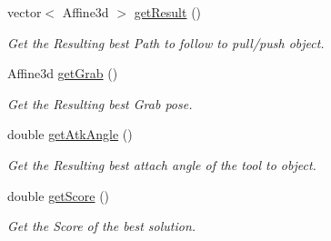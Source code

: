 \begin{DoxyCompactItemize}
vector$<$ Affine3d $>$ \hyperlink{classMCT__Search_ab28fe87c4254e464ab8cfce14ffc665e}{get\+Result} ()
\begin{DoxyCompactList}\small\item\em Get the Resulting best Path to follow to pull/push object. \end{DoxyCompactList}\item 
Affine3d \hyperlink{classMCT__Search_a924b943dc6a98886ada00eb596d04e1c}{get\+Grab} ()
\begin{DoxyCompactList}\small\item\em Get the Resulting best Grab pose. \end{DoxyCompactList}\item 
double \hyperlink{classMCT__Search_ac21fe2ffab807bfcc9c8da9863791433}{get\+Atk\+Angle} ()
\begin{DoxyCompactList}\small\item\em Get the Resulting best attach angle of the tool to object. \end{DoxyCompactList}\item 
double \hyperlink{classMCT__Search_aa7029de4d31d20f106ce215affca20e0}{get\+Score} ()
\begin{DoxyCompactList}\small\item\em Get the Score of the best solution. \end{DoxyCompactList}\end{DoxyCompactItemize}
